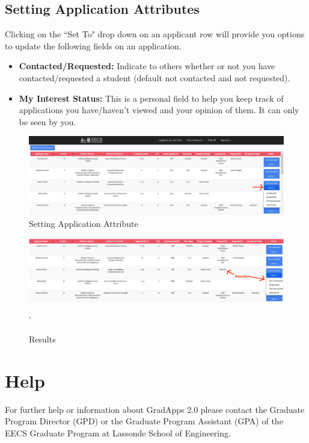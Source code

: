 \documentclass[fontsize=12pt,paper=letter,twoside]{scrartcl}
\begin{document}
\subsection{Setting Application Attributes}
Clicking on the ``Set To" drop down on an applicant row will provide you options to update the following fields on an application.
\begin{itemize}
\item \textbf{Contacted/Requested:} Indicate to others whether or not you have contacted/requested a student (default not contacted and not requested).
\item \textbf{My Interest Status:} This is a personal field to help you keep track of applications you have/haven't viewed and your opinion of them. It can only be seen by you.
\end{itemize}

\begin{figure}[!htb]
\begin{center}
\includegraphics[width=.99\textwidth]{images/prof/set_attribute.png}
\end{center}
\caption{Setting Application Attribute}
\label{fig:prof/set_attribute}
\end{figure}

\begin{figure}[!htb]
\begin{center}
\includegraphics[width=.99\textwidth]{images/prof/set_attribute2.png}
\end{center}`
\caption{Results}
\label{fig:prof/set_attribute_results}
\end{figure}

\clearpage
\newpage
\section{Help}
For further help or information about GradApps 2.0 please contact the Graduate Program Director (GPD) or the Graduate Program Assistant (GPA) of the EECS Graduate Program at Lassonde School of Engineering.\\
\end{document}

